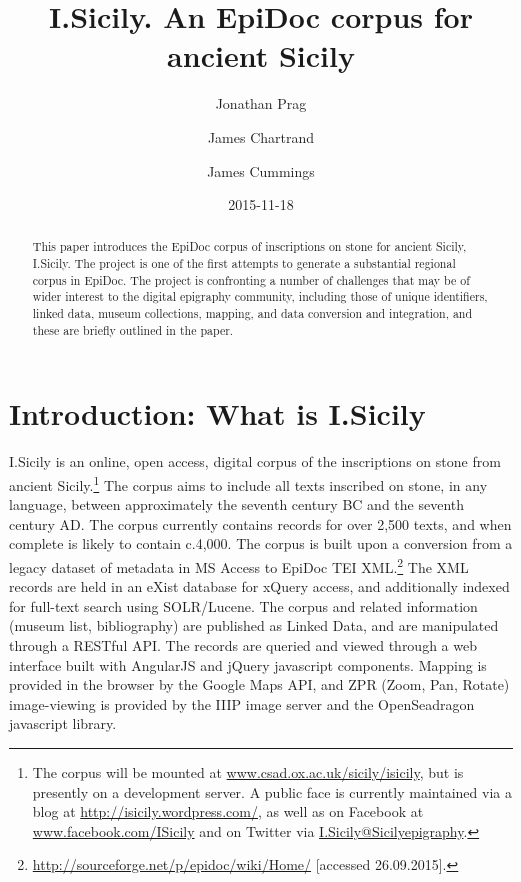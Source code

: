 \documentclass[amsthm,ebook]{saparticle}
\title{I.Sicily. An EpiDoc corpus for ancient Sicily}
\author[OXF]{Jonathan Prag\corref{first}}
\author[opensky]{James Chartrand}
\author[OXF]{James Cummings}
\date{2015-11-18}
\begin{document}
\maketitle
\begin{abstract}
This paper introduces the EpiDoc corpus of inscriptions on stone for ancient Sicily, I.Sicily. The project is one of the
first attempts to generate a substantial regional corpus in EpiDoc. The project is confronting a number of challenges
that may be of wider interest to the digital epigraphy community, including those of unique identifiers, linked data,
museum collections, mapping, and data conversion and integration, and these are briefly outlined in the paper.
\end{abstract}




\section{Introduction: What is I.Sicily}


I.Sicily is an online, open access, digital corpus of the inscriptions on stone from ancient Sicily.\footnote{ The
corpus will be mounted at \url{www.csad.ox.ac.uk/sicily/isicily}, but is presently on a development server. A public face is
currently maintained via a blog at \url{http://isicily.wordpress.com/}, as well as on Facebook at \url{www.facebook.com/ISicily}
and on Twitter via \url{I.Sicily@Sicilyepigraphy}.} The corpus aims to include all texts inscribed on stone, in any language,
between approximately the seventh century BC and the seventh century AD. The corpus currently contains records for over
2,500 texts, and when complete is likely to contain c.4,000. The corpus is built upon a conversion from a legacy
dataset of metadata in MS Access to EpiDoc TEI XML.\footnote{\url{http://sourceforge.net/p/epidoc/wiki/Home/} [accessed
26.09.2015].} The XML records are held in an eXist database for xQuery access, and additionally indexed for full-text
search using SOLR/Lucene. The corpus and related information (museum list, bibliography) are published as Linked Data,
and are manipulated through a RESTful API. The records are queried and viewed through a web interface built with
AngularJS and jQuery javascript components. Mapping is provided in the browser by the Google Maps API, and ZPR (Zoom,
Pan, Rotate) image-viewing is provided by the IIIP image server and the OpenSeadragon javascript library.
\end{document}
